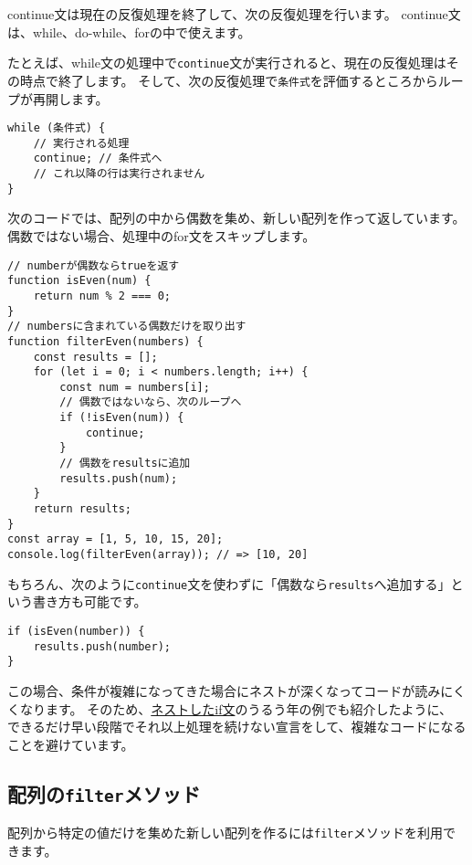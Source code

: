 continue文は現在の反復処理を終了して、次の反復処理を行います。
continue文は、while、do-while、forの中で使えます。

たとえば、while文の処理中で\texttt{continue}文が実行されると、現在の反復処理はその時点で終了します。
そして、次の反復処理で\texttt{条件式}を評価するところからループが再開します。

\begin{lstlisting}
while (条件式) {
    // 実行される処理
    continue; // 条件式へ
    // これ以降の行は実行されません
}
\end{lstlisting}

次のコードでは、配列の中から偶数を集め、新しい配列を作って返しています。
偶数ではない場合、処理中のfor文をスキップします。

\begin{lstlisting}
// numberが偶数ならtrueを返す
function isEven(num) {
    return num % 2 === 0;
}
// numbersに含まれている偶数だけを取り出す
function filterEven(numbers) {
    const results = [];
    for (let i = 0; i < numbers.length; i++) {
        const num = numbers[i];
        // 偶数ではないなら、次のループへ
        if (!isEven(num)) {
            continue;
        }
        // 偶数をresultsに追加
        results.push(num);
    }
    return results;
}
const array = [1, 5, 10, 15, 20];
console.log(filterEven(array)); // => [10, 20]
\end{lstlisting}

もちろん、次のように\texttt{continue}文を使わずに「偶数なら\texttt{results}へ追加する」という書き方も可能です。

\begin{lstlisting}
if (isEven(number)) {
    results.push(number);
}
\end{lstlisting}

この場合、条件が複雑になってきた場合にネストが深くなってコードが読みにくくなります。
そのため、\hyperlink{nested-if-statement}{ネストしたif文}のうるう年の例でも紹介したように、
できるだけ早い段階でそれ以上処理を続けない宣言をして、複雑なコードになることを避けています。

\hypertarget{array-filter}{%
\subsection{\texorpdfstring{配列の\texttt{filter}メソッド}{配列のfilterメソッド}}\label{array-filter}}

配列から特定の値だけを集めた新しい配列を作るには\texttt{filter}メソッドを利用できます。

